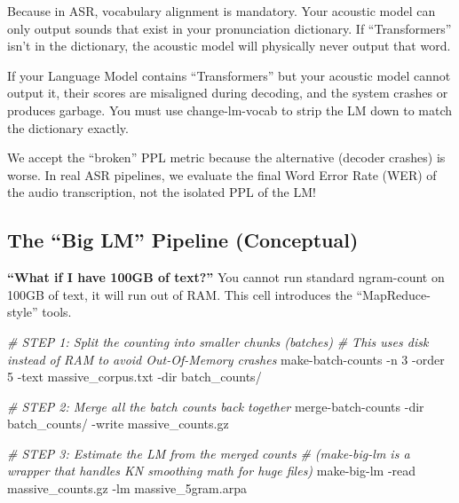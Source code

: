 \documentclass[11pt]{article}
\newenvironment{Shaded}{}{}
\newcommand{\CommentTok}[1]{\textcolor[rgb]{0.38,0.63,0.69}{\textit{{#1}}}}
\newcommand{\NormalTok}[1]{{#1}}
\newcommand{\ExtensionTok}[1]{{#1}}
\newcommand{\AttributeTok}[1]{\textcolor[rgb]{0.49,0.56,0.16}{{#1}}}
\begin{document}
Because in ASR, vocabulary alignment is mandatory. Your acoustic model
can only output sounds that exist in your pronunciation dictionary. If
``Transformers'' isn't in the dictionary, the acoustic model will
physically never output that word.

If your Language Model contains ``Transformers'' but your acoustic model
cannot output it, their scores are misaligned during decoding, and the
system crashes or produces garbage. You must use change-lm-vocab to
strip the LM down to match the dictionary exactly.

We accept the ``broken'' PPL metric because the alternative (decoder
crashes) is worse. In real ASR pipelines, we evaluate the final Word
Error Rate (WER) of the audio transcription, not the isolated PPL of the
LM!

    \hypertarget{the-big-lm-pipeline-conceptual}{%
\subsection{The ``Big LM'' Pipeline
(Conceptual)}\label{the-big-lm-pipeline-conceptual}}

\textbf{``What if I have 100GB of text?''} You cannot run standard
ngram-count on 100GB of text, it will run out of RAM. This cell
introduces the ``MapReduce-style'' tools.

\begin{Shaded}
\begin{Highlighting}[]
\CommentTok{\# STEP 1: Split the counting into smaller chunks (batches)}
\CommentTok{\# This uses disk instead of RAM to avoid Out{-}Of{-}Memory crashes}
\ExtensionTok{make{-}batch{-}counts} \AttributeTok{{-}n}\NormalTok{ 3 }\AttributeTok{{-}order}\NormalTok{ 5 }\AttributeTok{{-}text}\NormalTok{ massive\_corpus.txt }\AttributeTok{{-}dir}\NormalTok{ batch\_counts/}

\CommentTok{\# STEP 2: Merge all the batch counts back together}
\ExtensionTok{merge{-}batch{-}counts} \AttributeTok{{-}dir}\NormalTok{ batch\_counts/ }\AttributeTok{{-}write}\NormalTok{ massive\_counts.gz}

\CommentTok{\# STEP 3: Estimate the LM from the merged counts}
\CommentTok{\# (make{-}big{-}lm is a wrapper that handles KN smoothing math for huge files)}
\ExtensionTok{make{-}big{-}lm} \AttributeTok{{-}read}\NormalTok{ massive\_counts.gz }\AttributeTok{{-}lm}\NormalTok{ massive\_5gram.arpa}
\end{Highlighting}
\end{Shaded}
\end{document}

